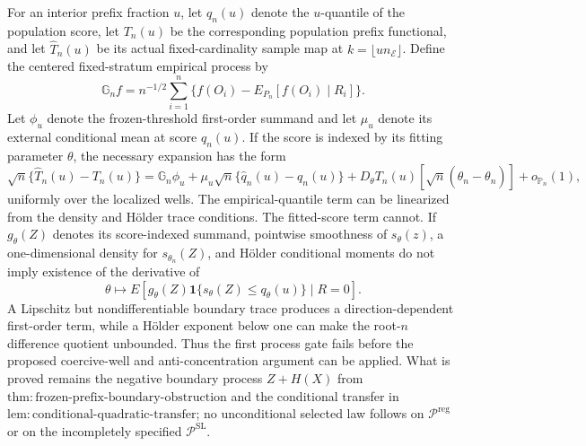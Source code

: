 For an interior prefix fraction \(u\), let \(q_n(u)\) denote the \(u\)-quantile of the population score, let \(T_n(u)\) be the corresponding population prefix functional, and let \(\widehat T_n(u)\) be its actual fixed-cardinality sample map at \(k=\lfloor un_{\mathcal E}\rfloor\).  Define the centered fixed-stratum empirical process by
\[
 \mathbb G_n f=n^{-1/2}\sum_{i=1}^n
 \{f(O_i)-E_{P_n}[f(O_i)\mid R_i]\}.
\]
Let \(\phi_u\) denote the frozen-threshold first-order summand and let \(\mu_u\) denote its external conditional mean at score \(q_n(u)\).  If the score is indexed by its fitting parameter \(\theta\), the necessary expansion has the form
\[
 \sqrt n\{\widehat T_n(u)-T_n(u)\}
 =\mathbb G_n\phi_u
 +\mu_u\sqrt n\{\widehat q_n(u)-q_n(u)\}
 +D_\theta T_n(u)[\sqrt n(\widehat\theta_n-\theta_n)]
 +o_{\mathbb P_n}(1),
\]
uniformly over the localized wells.  The empirical-quantile term can be linearized from the density and H\"older trace conditions.  The fitted-score term cannot.  If \(g_\theta(Z)\) denotes its score-indexed summand, pointwise smoothness of \(s_\theta(z)\), a one-dimensional density for \(s_{\theta_n}(Z)\), and H\"older conditional moments do not imply existence of the derivative of
\[
 \theta\longmapsto
 E\!\left[g_\theta(Z)\mathbf1\{s_\theta(Z)\leq q_\theta(u)\}\mid R=0\right].
\]
A Lipschitz but nondifferentiable boundary trace produces a direction-dependent first-order term, while a H\"older exponent below one can make the root-\(n\) difference quotient unbounded.  Thus the first process gate fails before the proposed coercive-well and anti-concentration argument can be applied.  What is proved remains the negative boundary process \(Z+H(X)\) from \(\mathrm{thm:frozen\text{-}prefix\text{-}boundary\text{-}obstruction}\) and the conditional transfer in \(\mathrm{lem:conditional\text{-}quadratic\text{-}transfer}\); no unconditional selected law follows on \(\mathcal P^{\mathrm{reg}}\) or on the incompletely specified \(\mathcal P^{\mathrm{SL}}\).


